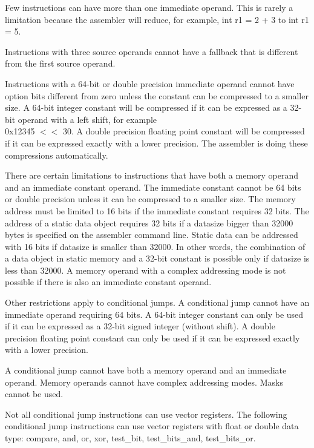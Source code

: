 \documentclass[forwardcom.tex]{subfiles}
\begin{document}
Few instructions can have more than one immediate operand. This is rarely a limitation because the assembler will reduce, for example, int r1 = 2 + 3  to int r1 = 5.
\vv

Instructions with three source operands cannot have a fallback that is different from the first source operand.
\vv

Instructions with a 64-bit or double precision immediate operand cannot have option bits different from zero unless the constant can be compressed to a smaller size. A 64-bit integer constant will be compressed if it can be expressed as a 32-bit operand with a left shift, for example \\
0x12345 $<<$ 30. A double precision floating point constant will be compressed if it can be expressed exactly with a lower precision. The assembler is doing these compressions automatically.
\vv

There are certain limitations to instructions that have both a memory operand and an immediate constant operand. The immediate constant cannot be 64 bits or double precision unless it can be compressed to a smaller size. The memory address must be limited to 16 bits if the immediate constant requires 32 bits. The address of a static data object requires 32 bits if a datasize bigger than 32000 bytes is specified on the assembler command line. Static data can be addressed with 16 bits if datasize is smaller than 32000. In other words, the combination of a data object in static memory and a 32-bit constant is possible only if datasize is less than 32000. A memory operand with a complex addressing mode is not possible if there is also an immediate constant operand.
\vv

Other restrictions apply to conditional jumps. 
A conditional jump cannot have an immediate operand requiring 64 bits. A 64-bit integer constant can only be used if it can be expressed as a 32-bit signed integer (without shift). A double precision floating point constant can only be used if it can be expressed exactly with a lower precision.
\vv

A conditional jump cannot have both a memory operand and an immediate operand. Memory operands cannot have complex addressing modes. Masks cannot be used.
\vv

Not all conditional jump instructions can use vector registers. The following conditional jump instructions can use vector registers with float or double data type: compare, and, or, xor, test\_bit, test\_bits\_and, test\_bits\_or.
\vv
\end{document}
